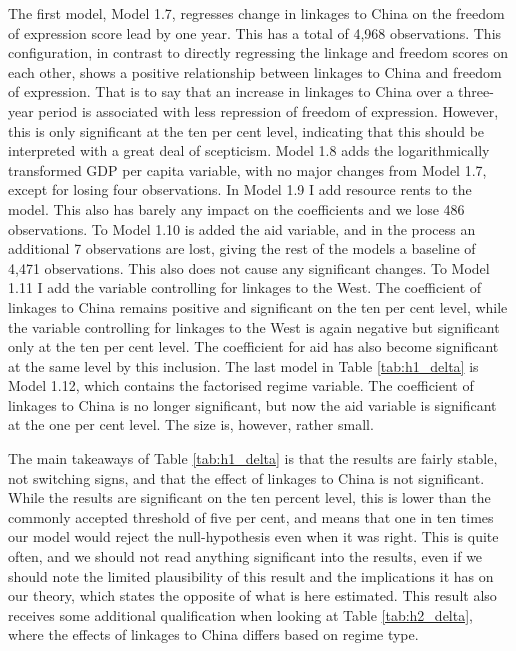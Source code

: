 The first model, Model 1.7, regresses change in linkages to China on the freedom of expression score lead by one year. This has a total of 4,968 observations. This configuration, in contrast to directly regressing the linkage and freedom scores on each other, shows a positive relationship between linkages to China and freedom of expression. That is to say that an increase in linkages to China over a three-year period is associated with less repression of freedom of expression. However, this is only significant at the ten per cent level, indicating that this should be interpreted with a great deal of scepticism. Model 1.8 adds the logarithmically transformed GDP per capita variable, with no major changes from Model 1.7, except for losing four observations. In Model 1.9 I add resource rents to the model. This also has barely any impact on the coefficients and we lose 486 observations. To Model 1.10 is added the aid variable, and in the process an additional 7 observations are lost, giving the rest of the models a baseline of 4,471 observations. This also does not cause any significant changes. To Model 1.11 I add the variable controlling for linkages to the West. The coefficient of linkages to China remains positive and significant on the ten per cent level, while the variable controlling for linkages to the West is again negative but significant only at the ten per cent level. The coefficient for aid has also become significant at the same level by this inclusion. The last model in Table \ref{tab:h1_delta} is Model 1.12, which contains the factorised regime variable. The coefficient of linkages to China is no longer significant, but now the aid variable is significant at the one per cent level. The size is, however, rather small. 

The main takeaways of Table \ref{tab:h1_delta} is that the results are fairly stable, not switching signs, and that the effect of linkages to China is not significant. While the results are significant on the ten percent level, this is lower than the commonly accepted threshold of five per cent, and means that one in ten times our model would reject the null-hypothesis even when it was right. This is quite often, and we should not read anything significant into the results, even if we should note the limited plausibility of this result and the implications it has on our theory, which states the opposite of what is here estimated. This result also receives some additional qualification when looking at Table \ref{tab:h2_delta}, where the effects of linkages to China differs based on regime type.

